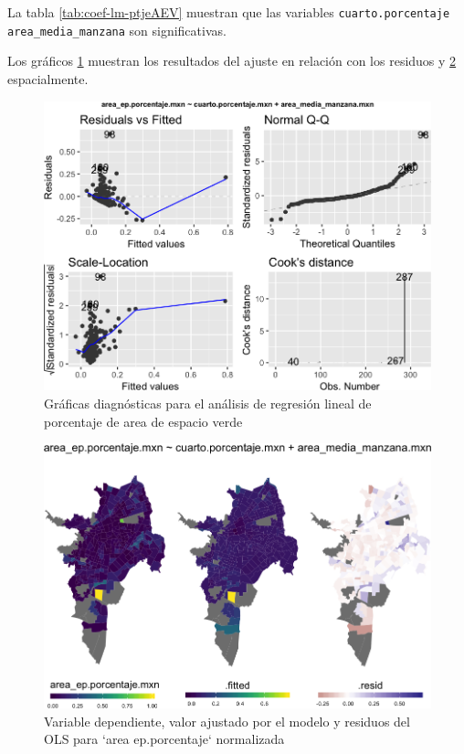 \documentclass[12pt,]{book}
\begin{document}
La tabla \ref{tab:coef-lm-ptjeAEV} muestran que las variables
\texttt{cuarto.porcentaje} \texttt{area\_media\_manzana} son
significativas.

Los gráficos \ref{fig:diagn-lm-areaep-sel} muestran los resultados del
ajuste en relación con los residuos y \ref{fig:mapas-lm-areaep}
espacialmente.

\begin{figure}
\includegraphics[width=1\linewidth]{tesis-unigis_files/figure-latex/diagn-lm-areaep-sel-1} \caption{Gráficas diagnósticas para el análisis de regresión lineal de porcentaje de area de espacio verde}\label{fig:diagn-lm-areaep-sel}
\end{figure}

\begin{figure}
\includegraphics[width=1\linewidth]{tesis-unigis_files/figure-latex/mapas-lm-areaep-1} \caption{Variable dependiente, valor ajustado por el modelo y residuos del OLS para `area ep.porcentaje` normalizada}\label{fig:mapas-lm-areaep}
\end{figure}
\end{document}

